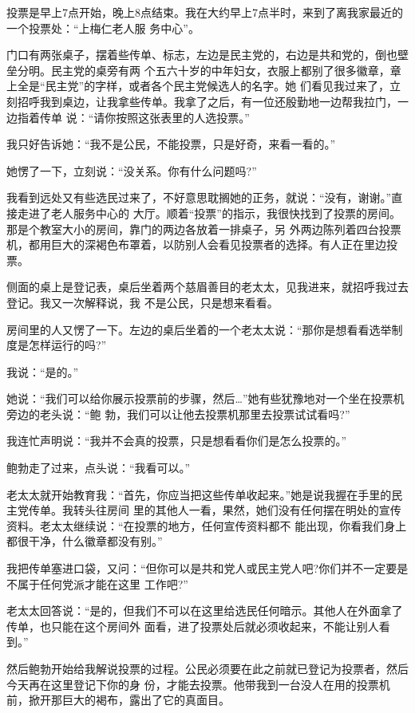 ﻿\documentclass[11pt]{article}
\begin{document}
投票是早上7点开始，晚上8点结束。我在大约早上7点半时，来到了离我家最近的一个投票处：``上梅仁老人服
务中心''。

门口有两张桌子，摆着些传单、标志，左边是民主党的，右边是共和党的，倒也壁垒分明。民主党的桌旁有两
个五六十岁的中年妇女，衣服上都别了很多徽章，章上全是``民主党''的字样，或者各个民主党候选人的名字。她
们看见我过来了，立刻招呼我到桌边，让我拿些传单。我拿了之后，有一位还殷勤地一边帮我拉门，一边指着传单
说：``请你按照这张表里的人选投票。''

我只好告诉她：``我不是公民，不能投票，只是好奇，来看一看的。''

她愣了一下，立刻说：``没关系。你有什么问题吗?''

我看到远处又有些选民过来了，不好意思耽搁她的正务，就说：``没有，谢谢。''直接走进了老人服务中心的
大厅。顺着``投票''的指示，我很快找到了投票的房间。那是个教室大小的房间，靠门的两边各放着一排桌子，另
外两边陈列着四台投票机，都用巨大的深褐色布罩着，以防别人会看见投票者的选择。有人正在里边投票。

侧面的桌上是登记表，桌后坐着两个慈眉善目的老太太，见我进来，就招呼我过去登记。我又一次解释说，我
不是公民，只是想来看看。

房间里的人又愣了一下。左边的桌后坐着的一个老太太说：``那你是想看看选举制度是怎样运行的吗?''

我说：``是的。''

她说：``我们可以给你展示投票前的步骤，然后\ldots ''她有些犹豫地对一个坐在投票机旁边的老头说：``鲍
勃，我们可以让他去投票机那里去投票试试看吗?''

我连忙声明说：``我并不会真的投票，只是想看看你们是怎么投票的。''

鲍勃走了过来，点头说：``我看可以。''

老太太就开始教育我：``首先，你应当把这些传单收起来。''她是说我握在手里的民主党传单。我转头往房间
里的其他人一看，果然，她们没有任何摆在明处的宣传资料。老太太继续说：``在投票的地方，任何宣传资料都不
能出现，你看我们身上都很干净，什么徽章都没有别。''

我把传单塞进口袋，又问：``但你可以是共和党人或民主党人吧?你们并不一定要是不属于任何党派才能在这里
工作吧?''

老太太回答说：``是的，但我们不可以在这里给选民任何暗示。其他人在外面拿了传单，也只能在这个房间外
面看，进了投票处后就必须收起来，不能让别人看到。''

然后鲍勃开始给我解说投票的过程。公民必须要在此之前就已登记为投票者，然后今天再在这里登记下你的身
份，才能去投票。他带我到一台没人在用的投票机前，掀开那巨大的褐布，露出了它的真面目。
\end{document}
